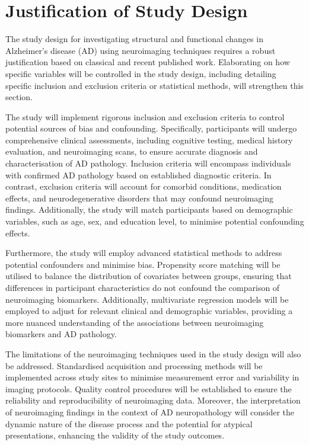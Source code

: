 \documentclass[10pt]{article}
\begin{document}
\begin{sloppypar}
  \section{Justification of Study Design}
  \label{sec:justification-of-study-design}

  The study design for investigating structural and functional changes in Alzheimer's disease (AD) using neuroimaging techniques requires a robust justification based on classical and recent published work. Elaborating on how specific variables will be controlled in the study design, including detailing specific inclusion and exclusion criteria or statistical methods, will strengthen this section.

  The study will implement rigorous inclusion and exclusion criteria to control potential sources of bias and confounding. Specifically, participants will undergo comprehensive clinical assessments, including cognitive testing, medical history evaluation, and neuroimaging scans, to ensure accurate diagnosis and characterisation of AD pathology. Inclusion criteria will encompass individuals with confirmed AD pathology based on established diagnostic criteria. In contrast, exclusion criteria will account for comorbid conditions, medication effects, and neurodegenerative disorders that may confound neuroimaging findings. Additionally, the study will match participants based on demographic variables, such as age, sex, and education level, to minimise potential confounding effects.

  Furthermore, the study will employ advanced statistical methods to address potential confounders and minimise bias. Propensity score matching will be utilised to balance the distribution of covariates between groups, ensuring that differences in participant characteristics do not confound the comparison of neuroimaging biomarkers. Additionally, multivariate regression models will be employed to adjust for relevant clinical and demographic variables, providing a more nuanced understanding of the associations between neuroimaging biomarkers and AD pathology.

  The limitations of the neuroimaging techniques used in the study design will also be addressed. Standardised acquisition and processing methods will be implemented across study sites to minimise measurement error and variability in imaging protocols. Quality control procedures will be established to ensure the reliability and reproducibility of neuroimaging data. Moreover, the interpretation of neuroimaging findings in the context of AD neuropathology will consider the dynamic nature of the disease process and the potential for atypical presentations, enhancing the validity of the study outcomes.


\end{sloppypar}
\end{document}
